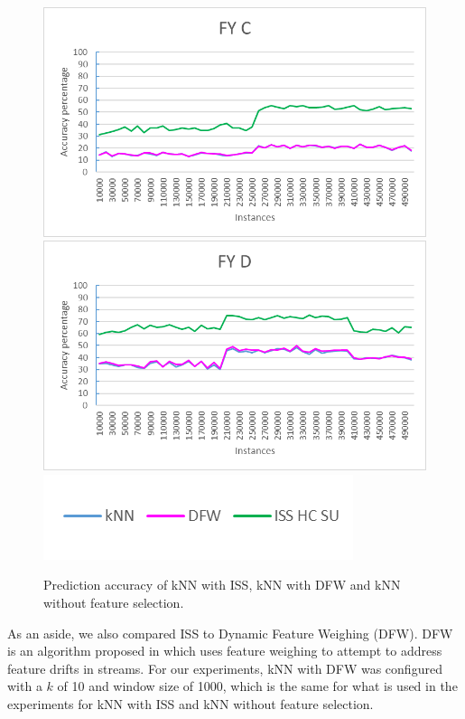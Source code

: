 \begin{figure}[h]
\includegraphics[scale=0.17]{Graphs/FY_C/vsDFW}
\includegraphics[scale=0.17]{Graphs/FY_D/vsDFW}
\includegraphics[scale=0.5]{Graphs/legend2}
\caption{Prediction accuracy of kNN with ISS, kNN with DFW and kNN without feature selection.}
\label{fig:Accuracy_comparason}
\end{figure}

As an aside, we also compared ISS to Dynamic Feature Weighing (DFW). DFW is an algorithm proposed in \citep{Barddal:2016} which uses feature weighing to attempt to address feature drifts in streams. For our experiments, kNN with DFW was configured with a $k$ of 10 and window size of 1000, which is the same for what is used in the experiments for kNN with ISS and kNN without feature selection.

